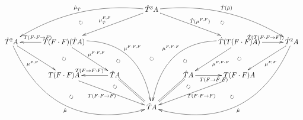 \documentclass[12pt]{article}
\begin{document}
\pagestyle{empty}

\begin{align*}
  \vcenter{
    \xymatrix@=30pt{
      & & &
      \hat{T}^3 A
      \ar@{{}{ }{}}[ddd]|{\circlearrowright}
      \ar@{->}[lld]_{\mu^{F,F}_{\hat{T}}}
      \ar@/_20pt/@{->}[llld]_{\hat{\mu}_{\hat{T}}}
      \ar@/_5pt/@{{}{ }{}}[llld]|{\circlearrowright}
      \ar@{->}[rrd]^{\hat{T}(\mu^{F,F})}
      \ar@/^20pt/@{->}[rrrd]^{\hat{T}(\hat{\mu})}
      \ar@/^5pt/@{{}{ }{}}[rrrd]|{\circlearrowright}
      \\
      \hat{T}^2 A
      \ar@{->}[rd]_{\mu^{F,F}}
      \ar@/_50pt/@{->}[rrrdd]_{\hat{\mu}}
      \ar@/_35pt/@{{}{ }{}}[rrrdd]|{\circlearrowright}
      &
      T (F \cdot F) (\hat{T} A)
      \ar@{->}[l]_{T (F \cdot F \to F)}
      \ar@/^40pt/@{->}[rrdd]^{\mu^{F \cdot F,F}}
      \ar@/^25pt/@{{}{ }{}}[rrdd]|{\circlearrowright}
      \ar@{->}[rd]^{\mu^{F \cdot F,F}}
      \ar@{{}{ }{}}[d]|{\circlearrowright}
      & & & &
      \hat{T} (T (F \cdot F) A)
      \ar@{->}[r]^{\hat{T}(T (F \cdot F \to F))}
      \ar@/_40pt/@{->}[lldd]_{\mu^{F,F \cdot F}}
      \ar@/_25pt/@{{}{ }{}}[lldd]|{\circlearrowright}
      \ar@{->}[ld]^{\mu^{F,F \cdot F}}
      \ar@{{}{ }{}}[d]|{\circlearrowright}
      &
      \hat{T}^2 A
      \ar@{->}[ld]^{\mu^{F,F}}
      \ar@/^50pt/@{->}[llldd]^{\hat{\mu}}
      \ar@/^35pt/@{{}{ }{}}[llldd]|{\circlearrowright}
      \\
      &
      T (F \cdot F) A
      \ar@{->}[rrd]_{T (F \cdot F \to F)}
      &
      \hat{T} A
      \ar@{->}[l]_{T (F \to F \cdot F)}
      \ar@{=}[rd]
      \ar@{{}{ }{}}[d]|(0.35){\circlearrowright}
      & &
      \hat{T} A
      \ar@{->}[r]_{T (F \to F \cdot F)}
      \ar@{=}[ld]
      \ar@{{}{ }{}}[d]|(0.35){\circlearrowright}
      &
      T (F \cdot F) A
      \ar@{->}[lld]^{T (F \cdot F \to F)}
      \\
      & & &
      \hat{T} A
      &
    }
  }
\end{align*}
\end{document}
